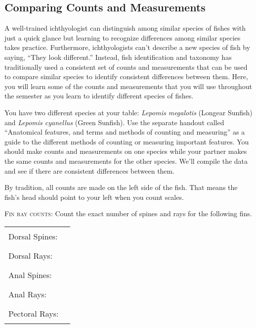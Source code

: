 \documentclass[12pt, hidelinks]{exam}
\begin{document}
\subsection*{Comparing Counts and Measurements}

A well-trained ichthyologist can distinguish among similar species of fishes with just a quick glance but learning to recognize differences among similar species takes practice.  Furthermore, ichthyologists can’t describe a new species of fish by saying, “They look different.”  Instead, fish identification and taxonomy has traditionally used a consistent set of counts and measurements that can be used to compare similar species to identify consistent differences between them. Here, you will learn some of the counts and measurements that you will use throughout the semester as you learn to identify different species of fishes.

You have two different species at your table: \textit{Lepomis megalotis} (Longear Sunfish) and \textit{Lepomis cyanellus} (Green Sunfish).  Use the separate handout called “Anatomical features, and terms and methods of counting and measuring” as a guide to the different methods of counting or measuring important features. You should make counts and measurements on one species while your partner makes the same counts and measurements for the other species.  We’ll compile the data and see if there are consistent differences between them.

By tradition, all counts are made on the left side of the fish.  That means the fish’s head should point to your left when you count scales.

\bigskip
\textsc{Fin ray counts:} Count the exact number of spines and rays for the following fins.

\bigskip

\begin{tabular}{ll}

Dorsal Spines: & \rule{3cm}{0.4pt} \\[1.5em]

Dorsal Rays: & \rule{3cm}{0.4pt} \\[1.5em]

Anal Spines: & \rule{3cm}{0.4pt} \\[1.5em]

Anal Rays: & \rule{3cm}{0.4pt} \\[1.5em]

Pectoral Rays: & \rule{3cm}{0.4pt} \\

\end{tabular}
\end{document}
